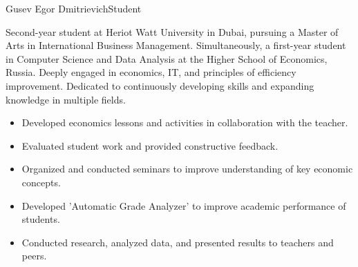 \documentclass{article}
\begin{document}
\begin{cv}[avatar]{Gusev Egor Dmitrievich}{Student}

Second-year student at Heriot Watt University in Dubai, pursuing a Master of Arts in International Business Management. Simultaneously, a first-year student in Computer Science and Data Analysis at the Higher School of Economics, Russia. Deeply engaged in economics, IT, and principles of efficiency improvement. Dedicated to continuously developing skills and expanding knowledge in multiple fields.



\begin{cvevent}[2022][2021]
    \begin{itemize}
        \item Developed economics lessons and activities in collaboration with the teacher.
        \item Evaluated student work and provided constructive feedback.
        \item Organized and conducted seminars to improve understanding of key economic concepts.
    \end{itemize}
\end{cvevent}

\begin{cvevent}[2022][2022]
    \begin{itemize}
        \item Developed 'Automatic Grade Analyzer' to improve academic performance of students.
        \item Conducted research, analyzed data, and presented results to teachers and peers.
    \end{itemize}
\end{cvevent}


\begin{cvevent}[2024][2022]
\end{cvevent}

\begin{cvevent}[2024][2022]
\end{cvevent}


\end{cv}
\end{document}
